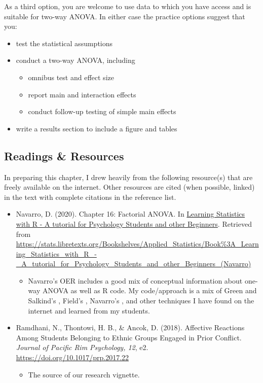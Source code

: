 \documentclass[
  11pt,
]{book}
\providecommand{\tightlist}{%
  \setlength{\itemsep}{0pt}\setlength{\parskip}{0pt}}
\begin{document}
As a third option, you are welcome to use data to which you have access and is suitable for two-way ANOVA. In either case the practice options suggest that you:

\begin{itemize}
\tightlist
\item
  test the statistical assumptions
\item
  conduct a two-way ANOVA, including

  \begin{itemize}
  \tightlist
  \item
    omnibus test and effect size
  \item
    report main and interaction effects
  \item
    conduct follow-up testing of simple main effects
  \end{itemize}
\item
  write a results section to include a figure and tables
\end{itemize}

\hypertarget{readings-resources-5}{%
\subsection{Readings \& Resources}\label{readings-resources-5}}

In preparing this chapter, I drew heavily from the following resource(s) that are freely available on the internet. Other resources are cited (when possible, linked) in the text with complete citations in the reference list.

\begin{itemize}
\tightlist
\item
  Navarro, D. (2020). Chapter 16: Factorial ANOVA. In \href{https://learningstatisticswithr.com/}{Learning Statistics with R - A tutorial for Psychology Students and other Beginners}. Retrieved from \url{https://stats.libretexts.org/Bookshelves/Applied_Statistics/Book\%3A_Learning_Statistics_with_R_-_A_tutorial_for_Psychology_Students_and_other_Beginners_(Navarro)}

  \begin{itemize}
  \tightlist
  \item
    Navarro's OER includes a good mix of conceptual information about one-way ANOVA as well as R code. My code/approach is a mix of Green and Salkind's \citeyearpar{green_using_2014}, Field's \citeyearpar{field_discovering_2012}, Navarro's \citeyearpar{navarro_chapter_2020}, and other techniques I have found on the internet and learned from my students.
  \end{itemize}
\item
  Ramdhani, N., Thontowi, H. B., \& Ancok, D. (2018). Affective Reactions Among Students Belonging to Ethnic Groups Engaged in Prior Conflict. \emph{Journal of Pacific Rim Psychology, 12}, e2. \url{https://doi.org/10.1017/prp.2017.22}

  \begin{itemize}
  \tightlist
  \item
    The source of our research vignette.
  \end{itemize}
\end{itemize}
\end{document}
